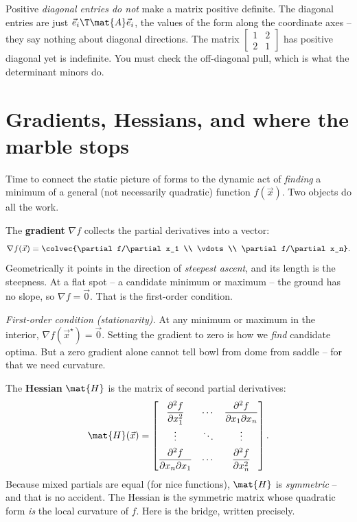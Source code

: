 \begin{trapbox}
Positive \emph{diagonal entries do not} make a matrix positive definite. The diagonal
entries are just $\vec{e}_i\T\mat{A}\vec{e}_i$, the values of the form along the
coordinate axes -- they say nothing about diagonal directions. The matrix
$\begin{bmatrix}1&2\\2&1\end{bmatrix}$ has positive diagonal yet is indefinite. You
must check the off-diagonal pull, which is what the determinant minors do.
\end{trapbox}

\section{Gradients, Hessians, and where the marble stops}
\label{ch36:gradient-hessian}

Time to connect the static picture of forms to the dynamic act of \emph{finding} a
minimum of a general (not necessarily quadratic) function $f(\vec{x})$. Two objects
do all the work.

The \textbf{gradient} $\nabla f$ collects the partial derivatives into a vector:
\[
  \nabla f(\vec{x}) = \colvec{\partial f/\partial x_1 \\ \vdots \\ \partial f/\partial x_n}.
\]
Geometrically it points in the direction of \emph{steepest ascent}, and its length is
the steepness. At a flat spot -- a candidate minimum or maximum -- the ground has no
slope, so $\nabla f=\vec{0}$. That is the first-order condition.

\begin{focusbox}
\emph{First-order condition (stationarity).} At any minimum or maximum in the
interior, $\nabla f(\vec{x}^\star)=\vec{0}$. Setting the gradient to zero is how we
\emph{find} candidate optima. But a zero gradient alone cannot tell bowl from dome
from saddle -- for that we need curvature.
\end{focusbox}

The \textbf{Hessian} $\mat{H}$ is the matrix of second partial derivatives:
\[
  \mat{H}(\vec{x}) = \begin{bmatrix}
   \dfrac{\partial^2 f}{\partial x_1^2} & \cdots & \dfrac{\partial^2 f}{\partial x_1\partial x_n}\\[8pt]
   \vdots & \ddots & \vdots\\[4pt]
   \dfrac{\partial^2 f}{\partial x_n\partial x_1} & \cdots & \dfrac{\partial^2 f}{\partial x_n^2}
  \end{bmatrix}.
\]
Because mixed partials are equal (for nice functions), $\mat{H}$ is \emph{symmetric}
-- and that is no accident. The Hessian is the symmetric matrix whose quadratic form
\emph{is} the local curvature of $f$. Here is the bridge, written precisely.

